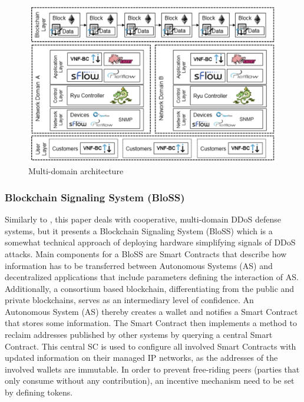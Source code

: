 \begin{figure}[ht]
  \begin{center}
  \includegraphics[scale=0.5]{Talk7/img/ddos/multi_domain}
  \end{center}
  \caption{Multi-domain architecture}
  \label{ddos_multi_domain_architecture}
\end{figure}


\subsubsection{Blockchain Signaling System (BloSS)}

Similarly to \cite{Rodrigues2017a}, this paper deals with cooperative, multi-domain DDoS defense systems, but it presents a Blockchain Signaling System (BloSS) which is a somewhat technical approach of deploying hardware simplifying signals of DDoS attacks. Main components for a BloSS are Smart Contracts that describe how information has to be transferred between Autonomous Systems (AS) and decentralized applications that include parameters defining the interaction of AS. Additionally, a consortium based blockchain, differentiating from the public and private blockchains, serves as an intermediary level of confidence. An Autonomous System (AS) thereby creates a wallet and notifies a Smart Contract that stores some information. The Smart Contract then implements a method to reclaim addresses published by other systems by querying a central Smart Contract. This central SC is used to configure all involved Smart Contracts with updated information on their managed IP networks, as the addresses of the involved wallets are immutable. In order to prevent free-riding peers (parties that only consume without any contribution), an incentive mechanism need to be set by defining tokens.  %
